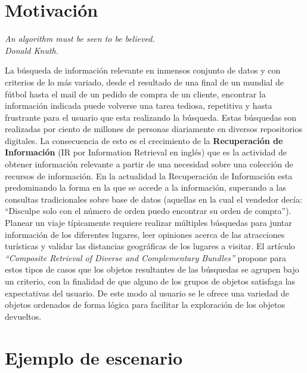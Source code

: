 \section{Motivación}
{\begin{small}%
\begin{flushright}%
\it An algorithm must be seen to be believed.\\Donald Knuth.
\end{flushright}%
\end{small}%
\vspace{.5cm}}
La búsqueda de información relevante en inmensos conjunto de datos y con criterios de lo más variado, desde el resultado de una final de un mundial de fútbol hasta el mail de un pedido de compra de un cliente, encontrar la información indicada puede volverse una tarea tediosa, repetitiva y hasta frustrante para el usuario que esta realizando la búsqueda. Estas búsquedas son realizadas por ciento de millones de personas diariamente en diversos repositorios digitales. La consecuencia de esto es el crecimiento de la \textbf{Recuperación de Información} (IR por Information Retrieval en inglés) que es la actividad de obtener información relevante a partir de una necesidad sobre una colección de recursos de información. En la actualidad la Recuperación de Información esta predominando la forma en la que se accede a la información, superando a las consultas tradicionales sobre base de datos (aquellas en la cual el vendedor decía: ``Disculpe solo con el número de orden puedo encontrar su orden de compra'').\\

Planear un viaje típicamente requiere realizar múltiples búsquedas para juntar información de los diferentes lugares, leer opiniones acerca de las atracciones turísticas y validar las distancias geográficas de los lugares a visitar. El artículo \textit{\textquotedblleft Composite Retrieval of Diverse and Complementary Bundles\textquotedblright}\cite{compositeRetrival} propone para estos tipos de casos que los objetos resultantes de las búsquedas se agrupen bajo un criterio, con la finalidad de que alguno de los grupos de objetos satisfaga las expectativas del usuario. De este modo al usuario se le ofrece una variedad de objetos ordenados de forma lógica para facilitar la exploración de los objetos devueltos.\\

\section{Ejemplo de escenario}

